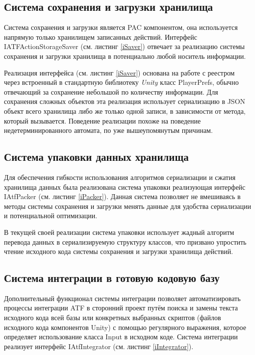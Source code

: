 \subsection{Система сохранения и загрузки хранилища}
Система сохранения и загрузки является PAC компонентом, она используется напрямую только хранилищем записанных действий. Интерфейс IATFActionStorageSaver (см. листинг \ref{iSaver}) отвечает за реализацию системы сохранения и загрузки хранилища в потенциально любой носитель информации.

Реализация интерфейса (см. листинг \ref{iSaver}) основана на работе с реестром через встроенный в стандартную библиотеку \textit{Unity} класс PlayerPrefs, обычно отвечающий за сохранение небольшой по количеству информации. Для сохранения сложных объектов эта реализация использует сериализацию в JSON объект всего хранилища либо же только одной записи, в зависимости от метода, который вызывается. Поведение реализации похоже на поведение недетерминированного автомата, по уже вышеупомянутым причинам.

\subsection{Система упаковки данных хранилища}
Для обеспечения гибкости использования алгоритмов сериализации и сжатия хранилища данных была реализована система упаковки реализующая интерфейс IAtfPacker (см. листинг \ref{iPacker}). Данная система позволяет не вмешиваясь в методы системы сохранения и загрузки менять данные для удобства сериализации и потенциальной оптимизации.

В текущей своей реализации система упаковки использует жадный алгоритм перевода данных в сериализируемую структуру классов, что призвано упростить чтение исходного кода системы сохранения и загрузки хранилища действий.

\subsection{Система интеграции в готовую кодовую базу}
Дополнительный функционал системы интеграции позволяет автоматизировать процессы интеграции ATF в сторонний проект путём поиска и замены текста исходного кода всей базы или конкретных выбранных скриптов (файлов исходного кода компонентов Unity) с помощью регулярного выражения, которое определяет использование класса Input в исходном коде. Система интеграции реализует интерфейс IAtfIntegrator (см. листинг \ref{iIntegrator}).


